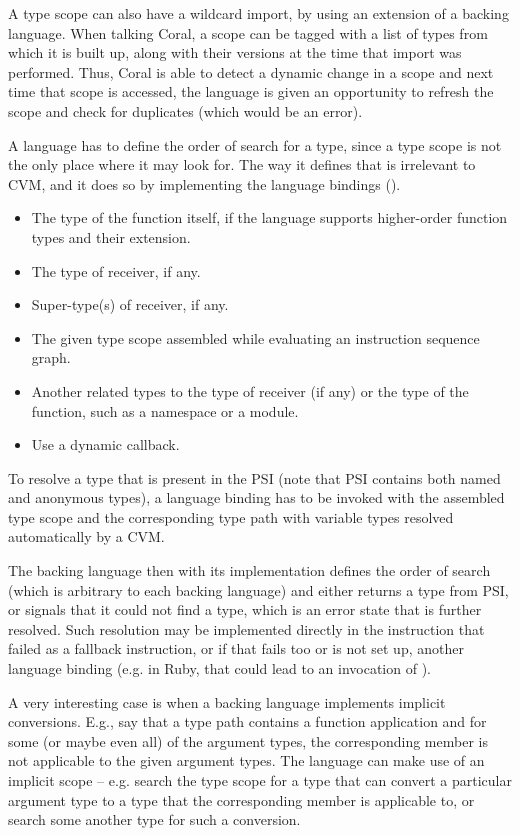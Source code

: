 A type scope can also have a wildcard import, by using an extension of a backing language. When talking Coral, a scope can be tagged with a list of types from which it is built up, along with their versions at the time that import was performed. Thus, Coral is able to detect a dynamic change in a scope and next time that scope is accessed, the language is given an opportunity to refresh the scope and check for duplicates (which would be an error). 

A language has to define the order of search for a type, since a type scope is not the only place where it may look for. The way it defines that is irrelevant to CVM, and it does so by implementing the language bindings (). 

\begin{itemize}
\item The type of the function itself, if the language supports higher-order function types and their extension. 
\item The type of receiver, if any. 
\item Super-type(s) of receiver, if any. 
\item The given type scope assembled while evaluating an instruction sequence graph. 
\item Another related types to the type of receiver (if any) or the type of the function, such as a namespace or a module. 
\item Use a dynamic callback. 
\end{itemize}

To resolve a type that is present in the PSI (note that PSI contains both named and anonymous types), a language binding has to be invoked with the assembled type scope and the corresponding type path with variable types resolved automatically by a CVM. 

The backing language then with its implementation defines the order of search (which is arbitrary to each backing language) and either returns a type from PSI, or signals that it could not find a type, which is an error state that is further resolved. Such resolution may be implemented directly in the instruction that failed as a fallback instruction, or if that fails too or is not set up, another language binding (e.g. in Ruby, that could lead to an invocation of ). 

A very interesting case is when a backing language implements implicit conversions. E.g., say that a type path contains a function application and for some (or maybe even all) of the argument types, the corresponding member is not applicable to the given argument types. The language can make use of an implicit scope -- e.g. search the type scope for a type that can convert a particular argument type to a type that the corresponding member is applicable to, or search some another type for such a conversion. 

